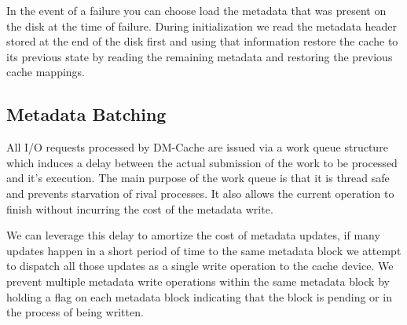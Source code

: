 In the event of a failure you can choose load the metadata that was
present on the disk at the time of failure. During initialization we
read the metadata header stored at the end of the disk first and using
that information restore the cache to its previous state by reading
the remaining metadata and restoring the previous cache mappings.

\subsection{Metadata Batching}

All I/O requests processed by DM-Cache are issued via a work queue
structure which induces a delay between the actual submission of the
work to be processed and it's execution. The main purpose of the work
queue is that it is thread safe and prevents starvation of rival
processes. It also allows the current operation to finish without
incurring the cost of the metadata write.

We can leverage this delay to amortize the cost of metadata updates,
if many updates happen in a short period of time to the same metadata
block we attempt to dispatch all those updates as a single write
operation to the cache device. We prevent multiple metadata write
operations within the same metadata block by holding a flag on each
metadata block indicating that the block is pending or in the process
of being written.
